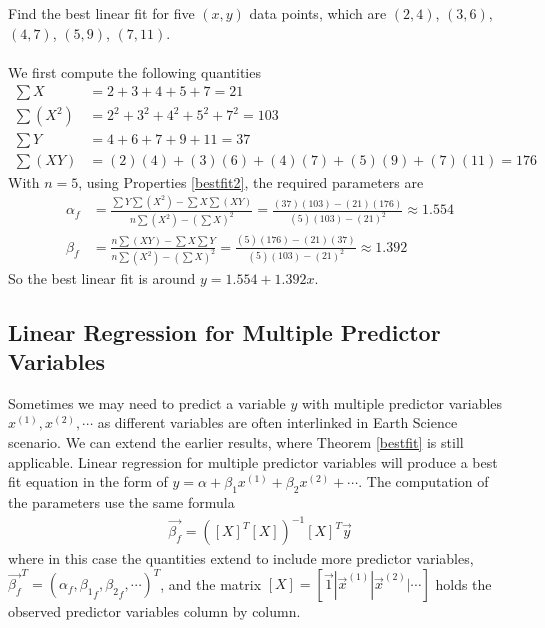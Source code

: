 \begin{exmp}
\label{ex11.1.1}
Find the best linear fit for five $(x,y)$ data points, which are $(2,4)$, $(3,6)$, $(4,7)$, $(5,9)$, $(7,11)$.\\
\\
We first compute the following quantities
\begin{align*}
\sum X &= 2+3+4+5+7 = 21 \\
\sum(X^2) &= 2^2+3^2+4^2+5^2+7^2 = 103 \\
\sum Y &= 4+6+7+9+11 = 37 \\
\sum (XY) &= (2)(4)+(3)(6)+(4)(7)+(5)(9)+(7)(11) = 176
\end{align*}
With $n=5$, using Properties \ref{bestfit2}, the required parameters are
\begin{align*}
\alpha_f &= \frac{\sum Y \sum (X^2) - \sum X \sum (XY)}{n\sum(X^2) - (\sum X)^2} = \frac{(37)(103)-(21)(176)}{(5)(103)-(21)^2} \approx 1.554 \\
\beta_f &= \frac{n \sum(XY) - \sum X \sum Y}{n\sum(X^2) - (\sum X)^2} = \frac{(5)(176)-(21)(37)}{(5)(103)-(21)^2} \approx 1.392
\end{align*}
So the best linear fit is around $y = 1.554 + 1.392x$.
\end{exmp}

\subsection{Linear Regression for Multiple Predictor Variables}

Sometimes we may need to predict a variable $y$ with multiple predictor variables $x^{(1)}, x^{(2)}, \cdots$ as different variables are often interlinked in Earth Science scenario. We can extend the earlier results, where Theorem \ref{bestfit} is still applicable. Linear regression for multiple predictor variables will produce a best fit equation in the form of $y = \alpha + \beta_1x^{(1)} + \beta_2x^{(2)} + \cdots$. The computation of the parameters use the same formula
\begin{align*}
\vec{\beta_f} = ([X]^T[X])^{-1}[X]^T \vec{y}
\end{align*}
where in this case the quantities extend to include more predictor variables, $\vec{\beta_f}^T = (\alpha_f, {\beta_1}_f, {\beta_2}_f, \cdots)^T$, and the matrix $[X] = [\vec{1}|\vec{x}^{(1)}|\vec{x}^{(2)}|\cdots]$ holds the observed predictor variables column by column.

